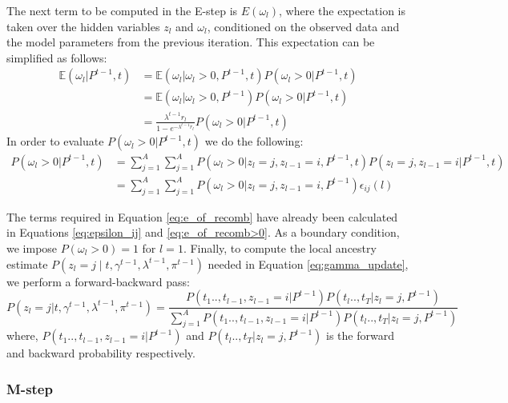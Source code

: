 The next term to be computed in the E-step is \( E(\omega_l) \), where the expectation is taken over the hidden variables \( z_l \) and \( \omega_l \), conditioned on the observed data and the model parameters from the previous iteration. This expectation can be simplified as follows:
\begin{align}
    \mathbb{E}(\omega_l \vert P^{t-1}, t) &= \mathbb{E}(\omega_l \vert \omega_l > 0, P^{t-1}, t) P( \omega_l > 0 \vert P^{t-1}, t) \nonumber \\
    &= \mathbb{E}(\omega_l \vert \omega_l > 0, P^{t-1}) P( \omega_l > 0 \vert P^{t-1}, t) \nonumber \\
    &= \frac{\lambda^{t-1}r_l}{1 - e^{-\lambda^{t-1}r_l}} P( \omega_l > 0 \vert P^{t-1}, t)
\label{eq:estep_121}
\end{align}
In order to evaluate $ P( \omega_l > 0 \vert P^{t-1}, t)$ we do the following: 
\begin{align}
  P( \omega_l > 0 \vert P^{t-1}, t) &= \sum\limits_{j=1}^{A}\sum\limits_{j=1}^{A}  P( \omega_l > 0 \vert z_l = j, z_{l-1} = i, P^{t-1}, t) P(z_l = j, z_{l-1} = i \vert P^{t-1}, t) \nonumber \\
  &= \sum\limits_{j=1}^{A}\sum\limits_{j=1}^{A}  P( \omega_l > 0 \vert z_l = j, z_{l-1} = i,  P^{t-1}) \epsilon_{ij}(l)
\label{eq:e_of_recomb}
\end{align}

The terms required in Equation \ref{eq:e_of_recomb} have already been calculated in Equations \ref{eq:epsilon_ij} and \ref{eq:e_of_recomb>0}. As a boundary condition, we impose \( P(\omega_l > 0) = 1 \) for \( l = 1 \). Finally, to compute the local ancestry estimate \( P(z_l = j \mid t, \gamma^{t-1}, \lambda^{t-1}, \pi^{t-1}) \) needed in Equation \ref{eq:gamma_update}, we perform a forward-backward pass:
\begin{equation}
    P(z_l = j \vert t, \gamma^{t-1}, \lambda^{t-1}, \pi^{t-1}) = \frac{P(t_1 .., t_{l-1}, z_{l-1}=i \vert P^{t-1})P(t_{l} .., t_T \vert z_l=j, P^{t-1})}{\sum\limits_{j=1}^{A}P(t_1 .., t_{l-1}, z_{l-1}=i \vert P^{t-1})P(t_{l} .., t_T \vert z_l=j, P^{t-1})}
\label{eq:hmm_forward_backward}
\end{equation}
where, $P(t_1 .., t_{l-1}, z_{l-1}=i \vert P^{t-1})$ and $P(t_{l} .., t_T \vert z_l=j, P^{t-1})$ is the forward and backward probability respectively. 

\subsubsection{M-step}

